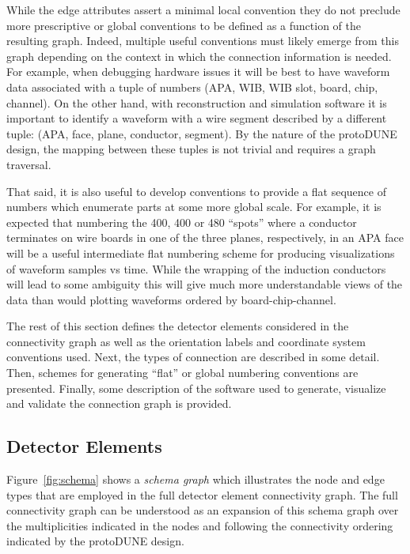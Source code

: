 \documentclass[pdftex,12pt,letter]{article}
\begin{document}
While the edge attributes assert a minimal local convention they do
not preclude more prescriptive or global conventions to be defined as
a function of the resulting graph.  Indeed, multiple useful
conventions must likely emerge from this graph depending on the
context in which the connection information is needed.  For example,
when debugging hardware issues it will be best to have waveform data
associated with a tuple of numbers (APA, WIB, WIB slot, board, chip,
channel).  On the other hand, with reconstruction and simulation
software it is important to identify a waveform with a wire segment
described by a different tuple: (APA, face, plane, conductor,
segment).  By the nature of the protoDUNE design, the mapping between
these tuples is not trivial and requires a graph traversal.

That said, it is also useful to develop conventions to provide a flat
sequence of numbers which enumerate parts at some more global scale.
For example, it is expected that numbering the 400, 400 or 480
``spots'' where a conductor terminates on wire boards in one of the
three planes, respectively, in an APA face will be a useful
intermediate flat numbering scheme for producing visualizations of
waveform samples vs time.  While the wrapping of the induction
conductors will lead to some ambiguity this will give much more
understandable views of the data than would plotting waveforms ordered
by board-chip-channel.

The rest of this section defines the detector elements considered in
the connectivity graph as well as the orientation labels and
coordinate system conventions used.  Next, the types of connection are
described in some detail.  Then, schemes for generating ``flat'' or
global numbering conventions are presented.  Finally, some description
of the software used to generate, visualize and validate the
connection graph is provided.


\subsection{Detector Elements}
\label{sec:parts}

Figure~\ref{fig:schema} shows a \textit{schema graph} which
illustrates the node and edge types that are employed in the full
detector element connectivity graph.  The full connectivity graph can
be understood as an expansion of this schema graph over the
multiplicities indicated in the nodes and following the connectivity
ordering indicated by the protoDUNE design.
\end{document}
